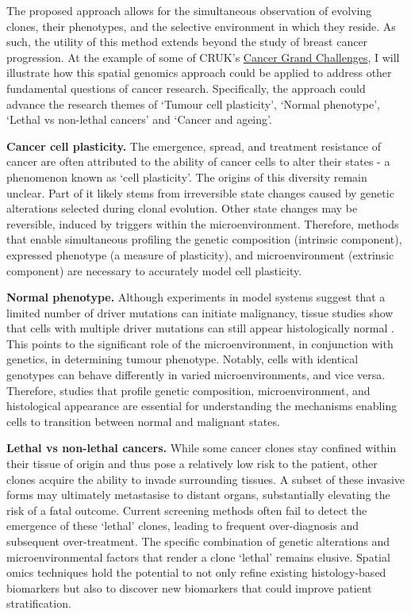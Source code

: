 The proposed approach allows for the simultaneous observation of evolving clones, their phenotypes, and the selective environment in which they reside. As such, the utility of this method extends beyond the study of breast cancer progression. At the example of some of CRUK's \href{https://cancergrandchallenges.org/}{Cancer Grand Challenges}, I will illustrate how this spatial genomics approach could be applied to address other fundamental questions of cancer research. Specifically, the approach could advance the research themes of `Tumour cell plasticity', `Normal phenotype', `Lethal vs non-lethal cancers' and `Cancer and ageing'.

\textbf{Cancer cell plasticity.} The emergence, spread, and treatment resistance of cancer are often attributed to the ability of cancer cells to alter their states - a phenomenon known as `cell plasticity'. The origins of this diversity remain unclear. Part of it likely stems from irreversible state changes caused by genetic alterations selected during clonal evolution. Other state changes may be reversible, induced by triggers within the microenvironment. Therefore, methods that enable simultaneous profiling the genetic composition (intrinsic component), expressed phenotype (a measure of plasticity), and microenvironment (extrinsic component) are necessary to accurately model cell plasticity.


\textbf{Normal phenotype.} Although experiments in model systems suggest that a limited number of driver mutations can initiate malignancy, tissue studies show that cells with multiple driver mutations can still appear histologically normal . This points to the significant role of the microenvironment, in conjunction with genetics, in determining tumour phenotype. Notably, cells with identical genotypes can behave differently in varied microenvironments, and vice versa. Therefore, studies that profile genetic composition, microenvironment, and histological appearance are essential for understanding the mechanisms enabling cells to transition between normal and malignant states.

\textbf{Lethal vs non-lethal cancers.} While some cancer clones stay confined within their tissue of origin and thus pose a relatively low risk to the patient, other clones acquire the ability to invade surrounding tissues. A subset of these invasive forms may ultimately metastasise to distant organs, substantially elevating the risk of a fatal outcome. Current screening methods often fail to detect the emergence of these `lethal' clones, leading to frequent over-diagnosis and subsequent over-treatment. The specific combination of genetic alterations and microenvironmental factors that render a clone `lethal' remains elusive. Spatial omics techniques hold the potential to not only refine existing histology-based biomarkers but also to discover new biomarkers that could improve patient stratification.

